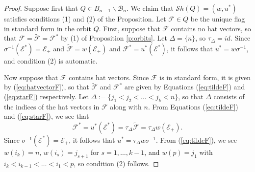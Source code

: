 \documentclass[10pt,a4paper]{amsart}
\newcommand{\Borbitspace}{B_{n-1}\backslash\B_{n}}
\newcommand{\B}{\mathcal{B}}
\newcommand{\F}{\mathcal{F}}
\newcommand{\Sh}{\mathcal{S}h}
\begin{document}
\begin{proof}
Suppose first that $Q\in\Borbitspace$.  We claim that $\Sh(Q)=(w,u^{*})$ satisfies conditions (1) and (2) of the
Proposition.  Let $\F\in Q$ be the unique flag in standard form in the orbit $Q$.  First, suppose that 
$\F$ contains no hat vectors, so that $\F=\tilde{\F}=\F^{*}$ by (1) of Proposition \ref{p:orbits}.  Let $\Delta=\{n\}$, so $\tau_{\Delta}=id$.  Since $\sigma^{-1}(\mathcal{E}^{*})=\mathcal{E_{+}}$ and $\tilde{\F}=w(\mathcal{E}_{+})$ and $\F^{*}=u^{*}(\mathcal{E}^{*})$, it follows that $u^{*}=w\sigma^{-1}$, and condition (2) is automatic.

Now suppose that $\F$ contains hat vectors.  Since $\F$ is in standard form, it is  given by (\ref{eq:hatvectorF}), so that $\tilde{\F}$ and $\F^{*}$ are given by Equations (\ref{eq:tildeF}) and (\ref{eq:starF}) 
respectively.  Let $\Delta:=\{j_{1}<j_{2}<\dots<j_{k}<n\}$, so that $\Delta$ consists of the indices of the hat 
vectors in $\F$ along with $n$.  
From Equations (\ref{eq:tildeF}) and (\ref{eq:starF}), we see that $$\F^{*}=u^{*}(\mathcal{E}^{*})=\tau_{\Delta}\tilde{\F}=\tau_{\Delta} w (\mathcal{E}_{+}).$$  
Since $\sigma^{-1}(\mathcal{E}^{*})=\mathcal{E}_{+}$, it follows that $u^{*}=\tau_{\Delta}w\sigma^{-1}$.   From (\ref{eq:tildeF}), we see $w(i_{k})=n,\, w(i_{s})=j_{s+1}$ for $s=1,\dots, k-1$, and $w(p)=j_{1}$ with $i_k < i_{k-1} < \dots < i_1 < p$, so condition (2) follows.



\end{proof}
\end{document}
